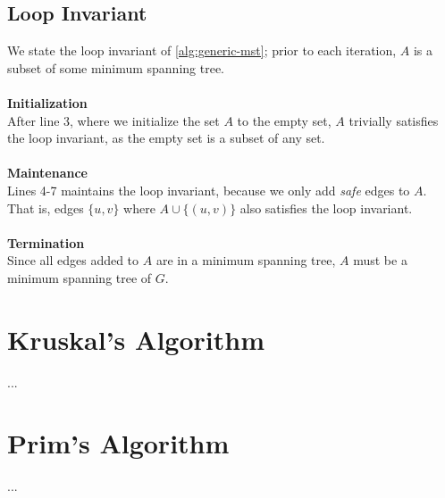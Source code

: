\subsection{Loop Invariant}
We state the loop invariant of \ref{alg:generic-mst}; prior to each iteration,
$A$ is a subset of some minimum spanning tree.
\\\\
\noindent \textbf{Initialization} \\
After line 3, where we initialize the set $A$ to the empty set, $A$ trivially
satisfies the loop invariant, as the empty set is a subset of any set.
\\\\
\noindent \textbf{Maintenance} \\
Lines 4-7 maintains the loop invariant, because we only add \textit{safe}
edges to $A$. That is, edges $\{u, v\}$ where $A \cup \{(u, v)\}$ also
satisfies the loop invariant.
\\\\
\noindent \textbf{Termination} \\
Since all edges added to $A$ are in a minimum spanning tree, $A$ must be a
minimum spanning tree of $G$.

\newpage
\section{Kruskal's Algorithm}
...


\section{Prim's Algorithm}
...

